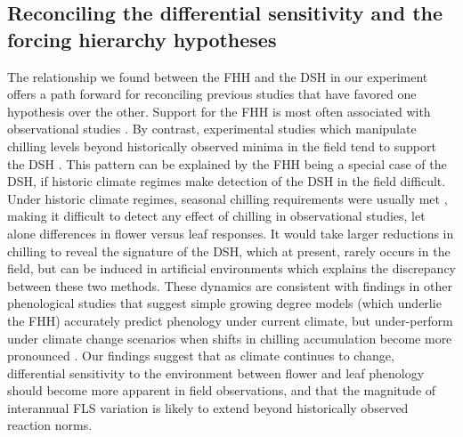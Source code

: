 \documentclass[12pt]{article}\usepackage[]{graphicx}\usepackage[]{color}
\begin{document}
\subsection*{Reconciling the differential sensitivity and the forcing hierarchy hypotheses}
\noindent The relationship we found between the FHH and the DSH in our experiment offers a path forward for reconciling previous studies that have favored one hypothesis over the other. Support for the FHH is most often associated with observational studies \citep[e.g.][]{COSMULESCU:2020aa,Guo2014}. By contrast, experimental studies which manipulate chilling levels beyond historically observed minima in the field tend to support the DSH \citep[e.g.][]{Aslani2009,Gariglio2006}. This pattern can be explained by the FHH being a special case of the DSH, if historic climate regimes make detection of the DSH in the field difficult.\\ %

\noindent Under historic climate regimes, seasonal chilling requirements were usually met \citep{Gauzere2019,Chuine:2016aa}, making it difficult to detect any effect of chilling in observational studies, let alone differences in flower versus leaf responses. It would take larger reductions in chilling to reveal the signature of the DSH, which at present, rarely occurs in the field, but can be induced in artificial environments which explains the discrepancy between these two methods. These dynamics are consistent with findings in other phenological studies that suggest simple growing degree models (which underlie the FHH) accurately predict phenology under current climate, but under-perform under climate change scenarios when shifts in chilling accumulation become more pronounced \citep{Linkosalo2008,Chuine:2016aa}. Our findings suggest that as climate continues to change, differential sensitivity to the environment between flower and leaf phenology should become more apparent in field observations, and that the magnitude of interannual FLS variation is likely to extend beyond historically observed reaction norms.\\ 

\end{document}
